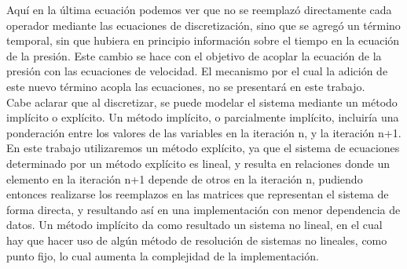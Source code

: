 \begin{minipage}{\linewidth}
Aquí en la última ecuación podemos ver que no se reemplazó directamente cada operador mediante las ecuaciones de discretización, sino que se agregó un término temporal, sin que hubiera en principio información sobre el tiempo en la ecuación de la presión. Este cambio se hace con el objetivo de acoplar la ecuación de la presión con las ecuaciones de velocidad. El mecanismo por el cual la adición de este nuevo término acopla las ecuaciones, no se presentará en este trabajo.
~\\

Cabe aclarar que al discretizar, se puede modelar el sistema mediante un método implícito o explícito. Un método implícito, o parcialmente implícito, incluiría una ponderación entre los valores de las variables en la iteración n, y la iteración n+1. En este trabajo utilizaremos un método explícito, ya que el sistema de ecuaciones determinado por un método explícito es lineal, y resulta en relaciones donde un elemento en la iteración n+1 depende de otros en la iteración n, pudiendo entonces realizarse los reemplazos en las matrices que representan el sistema de forma directa, y resultando así en una implementación con menor dependencia de datos. Un método implícito da como resultado un sistema no lineal, en el cual hay que hacer uso de algún método de resolución de sistemas no lineales, como punto fijo, lo cual aumenta la complejidad de la implementación.

\end{minipage}

\newpage

